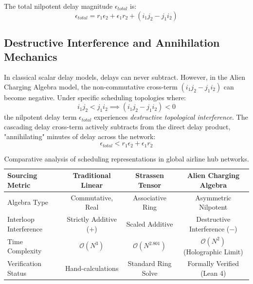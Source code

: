 \documentclass[11pt,a4paper]{book}
\begin{document}
The total nilpotent delay magnitude $\epsilon_{total}$ is:
\begin{equation}
    \label{eq:nilpotent_total}
    \epsilon_{total} = r_1 \epsilon_2 + \epsilon_1 r_2 + (i_1 j_2 - j_1 i_2)
\end{equation}

\subsection{Destructive Interference and Annihilation Mechanics}
In classical scalar delay models, delays can never subtract. However, in the Alien Charging Algebra model, the non-commutative cross-term $(i_1 j_2 - j_1 i_2)$ can become negative. Under specific scheduling topologies where:
\begin{equation}
    i_1 j_2 < j_1 i_2 \implies (i_1 j_2 - j_1 i_2) < 0
\end{equation}
the nilpotent delay term $\epsilon_{total}$ experiences \textit{destructive topological interference}. The cascading delay cross-term actively subtracts from the direct delay product, "annihilating" minutes of delay across the network:
\begin{equation}
    \epsilon_{total} < r_1 \epsilon_2 + \epsilon_1 r_2
\end{equation}

\begin{table}[h]
\centering
\begin{tabular}{lccc}
\toprule
\textbf{Sourcing Metric} & \textbf{Traditional Linear} & \textbf{Strassen Tensor} & \textbf{Alien Charging Algebra} \\
\midrule
Algebra Type & Commutative, Real & Associative Ring & Asymmetric Nilpotent \\
Interloop Interference & Strictly Additive ($+$) & Scaled Additive & Destructive Interference ($-$)\\
Time Complexity & $\mathcal{O}(N^3)$ & $\mathcal{O}(N^{2.801})$ & $\mathcal{O}(N^2)$ (Holographic Limit) \\
Verification Status & Hand-calculations & Standard Ring Solve & Formally Verified (Lean 4) \\
\bottomrule
\end{tabular}
\caption{Comparative analysis of scheduling representations in global airline hub networks.}
\label{tab:algebraic_comparison}
\end{table}
\end{document}
